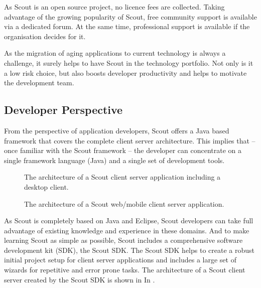 \documentclass[a4paper,10pt,twoside]{book}
\begin{document}
As Scout is an open source project, no licence fees are collected. 
Taking advantage of the growing popularity of Scout, free community support is available via a dedicated forum. 
At the same time, professional support is available if the organisation decides for it.

As the migration of aging applications to current technology is always a challenge, it surely helps to have Scout in the technology portfolio. 
Not only is it a low risk choice, but also boosts developer productivity and helps to motivate the development team. 

\subsection{Developer Perspective}

From the perspective of application developers, Scout offers a Java based framework that covers the complete client server architecture. 
This implies that -- once familiar with the Scout framework -- the developer can concentrate on a single framework language (Java) and a single set of development tools. 

\begin{figure}
\caption{The architecture of a Scout client server application including a desktop client.}
\end{figure}

\begin{figure}
\caption{The architecture of a Scout web/mobile client server application.}
\end{figure}

As Scout is completely based on Java and Eclipse, Scout developers can take full advantage of existing knowledge and experience in these domains. 
And to make learning Scout as simple as possible, Scout includes a comprehensive software development kit (SDK), the Scout SDK.
The Scout SDK helps to create a robust initial project setup for client server applications and includes a large set of wizards for repetitive and error prone tasks.
The architecture of a Scout client server created by the Scout SDK is shown in In .
\end{document}
